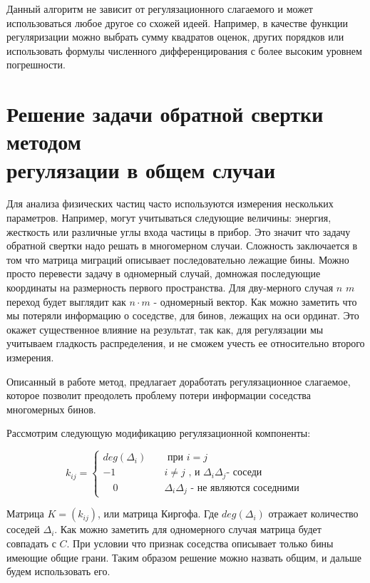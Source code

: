 \documentclass[a4paper,12pt]{diplom}
\begin{document}
Данный алгоритм не зависит от регулязационного слагаемого и может использоваться любое другое со схожей идеей. 
Например, в качестве функции регуляризации можно выбрать сумму квадратов оценок, других порядков или использовать формулы численного 
дифференцирования с более высоким уровнем погрешности.





\section[Многомерный случай]{Решение задачи обратной свертки методом \\ регулязации в общем случаи}

Для анализа физических частиц часто используются измерения нескольких параметров. Например, могут учитываться следующие величины: 
энергия, жесткость или различные углы входа частицы в прибор. Это значит что задачу обратной свертки надо решать в многомерном 
случаи. Сложность заключается в том что матрица миграций описывает последовательно лежащие бины. Можно просто перевести задачу 
в одномерный случай, домножая последующие координаты на размерность первого пространства. Для дву-мерного случая $n$ $m$ переход 
будет выглядит как $n \cdot m$ - одномерный вектор. Как можно заметить что мы потеряли информацию о соседстве, для бинов, лежащих на
оси ординат. Это окажет существенное влияние на результат, так как, для регулязации мы учитываем гладкость распределения, и не 
сможем учесть ее относительно второго измерения.

Описанный в работе \cite{SvdBogomolov} метод, предлагает доработать регулязационное слагаемое, которое позволит преодолеть проблему потери информации 
соседства многомерных бинов.

Рассмотрим следующую модификацию регулязационной компоненты:

\begin{equation}
 k_{ij} =
  \begin{cases}
    deg(\Delta_{i}) & \quad \text{ при } i = j \\
     -1              & \quad i \neq j  \text{ , и } \Delta_{i} \Delta_{j} \text{- соседи } \\
\quad 0               & \quad \Delta_{i} \Delta_{j} \text{ - не являются соседними }
  \end{cases}
\end{equation}

Матрица $K = (k_{ij})$, или матрица Киргофа. Где $deg(\Delta_{i})$ отражает количество соседей $\Delta_{i}$. 
Как можно заметить для одномерного случая матрица будет совпадать 
с $C$. При условии что признак соседства описывает только бины имеющие общие грани. 
Таким образом решение можно назвать общим, и дальше будем использовать его.
\end{document}
